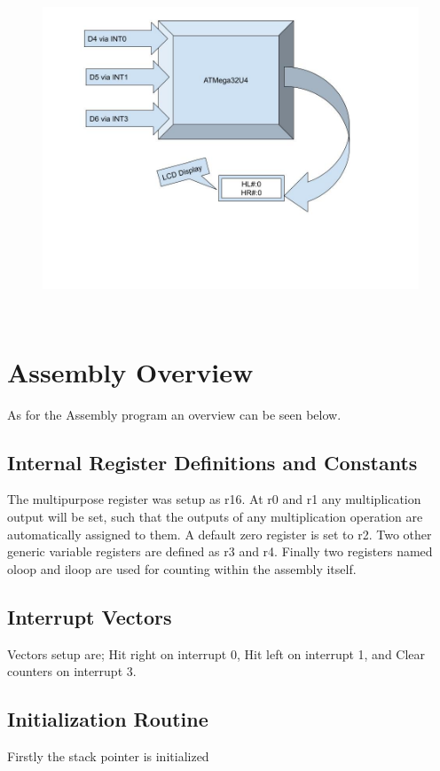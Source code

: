 \documentclass[12pt,letterpaper]{article}
\begin{document}
\begin{figure}[h]
	\includegraphics[width=12cm, height=10cm]{Block Diagram L5.jpg}
	\centering
\end{figure}
	
\section{Assembly Overview}
As for the Assembly program an overview can be seen below. 

\subsection{Internal Register Definitions and Constants}
The multipurpose register was setup as r16. At r0 and r1 any multiplication output will be set, such that the outputs of any multiplication operation are automatically assigned to them. A default zero register is set to r2. Two other generic variable registers are defined as r3 and r4. Finally two registers named oloop and iloop are used for counting within the assembly itself.

\subsection{Interrupt Vectors}
Vectors setup are;
Hit right on interrupt 0,
Hit left on interrupt 1,
and Clear counters on interrupt 3.



\subsection{Initialization Routine}
Firstly the stack pointer is initialized
\end{document}
